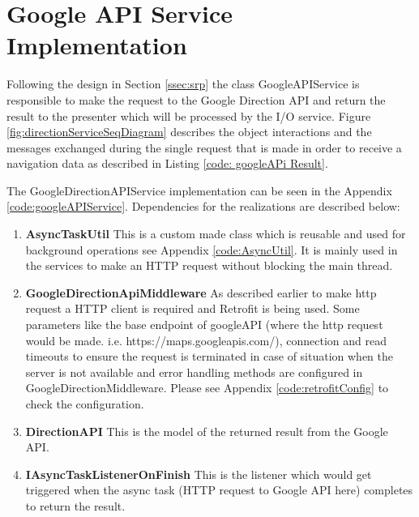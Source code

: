 
\section{Google API Service Implementation}
    Following the design in Section \ref{ssec:srp} the class 
    GoogleAPIService is responsible to make the request to the Google
    Direction API and return the result to the presenter which will be
    processed by the I/O service. Figure \ref{fig:directionServiceSeqDiagram}
    describes the object interactions and the messages exchanged during the
    single request that is made in order to receive a navigation data as described in
    Listing \ref{code: googleAPi Result}.
    
    \par
        The GoogleDirectionAPIService implementation can be seen in the
        Appendix \ref{code:googleAPIService}.
        Dependencies for the realizations are described below:
        \begin{enumerate}
            \item  
                \textbf{AsyncTaskUtil}
                    This is a custom made class which is reusable and used for background
                    operations see Appendix \ref{code:AsyncUtil}. It is mainly used in the services 
                    to make an HTTP request without blocking the main thread. 
            \item  
                \textbf{GoogleDirectionApiMiddleware}
                As described earlier to make http request a HTTP client 
                is required and Retrofit
                is being used. Some parameters like the base endpoint of googleAPI 
                (where the http
                request would be made. i.e. https://maps.googleapis.com/), 
                connection and read timeouts
                to ensure the request is terminated 
                in case of situation when the server is not available 
                and error handling methods are configured in 
                GoogleDirectionMiddleware. Please see Appendix 
                \ref{code:retrofitConfig} to check the configuration. 
            \item  
                \textbf{DirectionAPI}
                    This is the model of the returned result from the Google
                    API.
            \item  
                \textbf{IAsyncTaskListenerOnFinish}
                    This is the listener which would get triggered when the
                    async task (HTTP request to Google API here) completes to
                    return the result.
        \end{enumerate}       
        



    